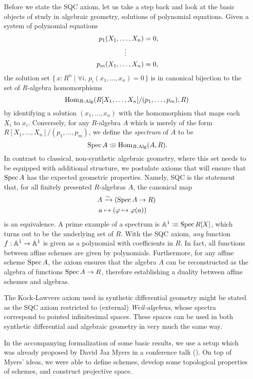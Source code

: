Before we state the SQC axiom, let us take a step back and look at the basic objects of study in algebraic geometry,
solutions of polynomial equations.
Given a system of polynomial equations
\begin{align*}
  p_1(X_1, \dots, X_n) &= 0\rlap{,} \\
  \vdots\quad\quad\;\;   \\
  p_m(X_1, \dots, X_n) &= 0\rlap{,}
\end{align*}
the solution set
$\{\, x : R^n \mid \forall i.\; p_i(x_1, \dots, x_n) = 0 \,\}$
is in canonical bijection to the set of $R$-algebra homomorphisms
\[ \mathrm{Hom}_{R\text{-}\mathrm{Alg}}(R[X_1, \dots, X_n]/(p_1, \dots, p_m), R) \]
by identifying a solution $(x_1,\dots,x_n)$ with the homomorphism that maps each $X_i$ to $x_i$.
Conversely, for any $R$-algebra $A$ which is merely of the form $R[X_1, \dots, X_n]/(p_1, \dots, p_m)$,
we define the \emph{spectrum} of $A$ to be
\[
  \Spec A \colonequiv \Hom_{\Alg{R}}(A, R)
  \rlap{.}
\]
In contrast to classical, non-synthetic algebraic geometry,
where this set needs to be equipped with additional structure,
we postulate axioms that will ensure that $\operatorname{Spec} A$ has the expected geometric properties.
Namely, SQC is the statement that, for all finitely presented $R$-algebras $A$, the canonical map
  \begin{align*}
    A&\xrightarrow{\sim} (\operatorname{Spec} A\to R) \\
    a&\mapsto (\varphi\mapsto \varphi(a))
  \end{align*}
is an equivalence.
A prime example of a spectrum is $\mathbb{A}^1\vcentcolon\mspace{-1.2mu}\equiv \operatorname{Spec} R[X]$,
which turns out to be the underlying set of $R$.
With the SQC axiom,
\emph{any} function $f:\mathbb{A}^1\to \mathbb{A}^1$ is given as a polynomial with coefficients in $R$.
In fact, all functions between affine schemes are given by polynomials.
Furthermore, for any affine scheme $\operatorname{Spec} A$,
the axiom ensures that
the algebra $A$ can be reconstructed as the algebra of functions $\operatorname{Spec} A \to R$,
therefore establishing a duality between affine schemes and algebras.

The Kock-Lawvere axiom used in synthetic differential geometry
might be stated as the SQC axiom restricted to (external) \emph{Weil-algebras},
whose spectra correspond to pointed infinitesimal spaces.
These spaces can be used in both synthetic differential and algebraic geometry
in very much the same way.

In the accompanying formalization \cite{formalization} of some basic results,
we use a setup which was already proposed by David Jaz Myers
in a conference talk (\cite{myers-talk1, myers-talk2}).
On top of Myers' ideas,
we were able to define schemes, develop some topological properties of schemes,
and construct projective space.


